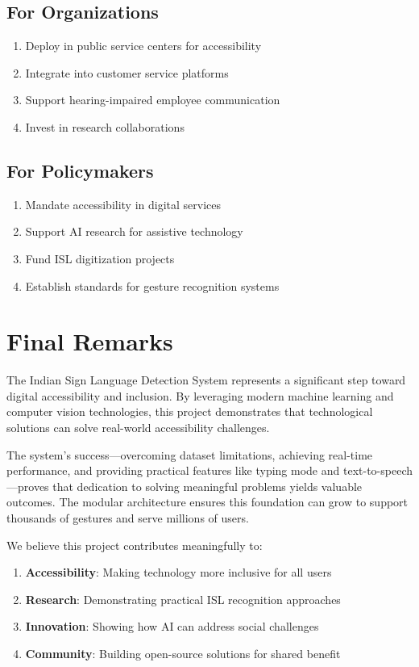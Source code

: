 \subsection{For Organizations}

\begin{enumerate}
    \item Deploy in public service centers for accessibility
    \item Integrate into customer service platforms
    \item Support hearing-impaired employee communication
    \item Invest in research collaborations
\end{enumerate}

\subsection{For Policymakers}

\begin{enumerate}
    \item Mandate accessibility in digital services
    \item Support AI research for assistive technology
    \item Fund ISL digitization projects
    \item Establish standards for gesture recognition systems
\end{enumerate}

\section{Final Remarks}

The Indian Sign Language Detection System represents a significant step toward digital accessibility and inclusion. By leveraging modern machine learning and computer vision technologies, this project demonstrates that technological solutions can solve real-world accessibility challenges.

The system's success—overcoming dataset limitations, achieving real-time performance, and providing practical features like typing mode and text-to-speech—proves that dedication to solving meaningful problems yields valuable outcomes. The modular architecture ensures this foundation can grow to support thousands of gestures and serve millions of users.

We believe this project contributes meaningfully to:
\begin{enumerate}
    \item \textbf{Accessibility}: Making technology more inclusive for all users
    \item \textbf{Research}: Demonstrating practical ISL recognition approaches
    \item \textbf{Innovation}: Showing how AI can address social challenges
    \item \textbf{Community}: Building open-source solutions for shared benefit
\end{enumerate}

